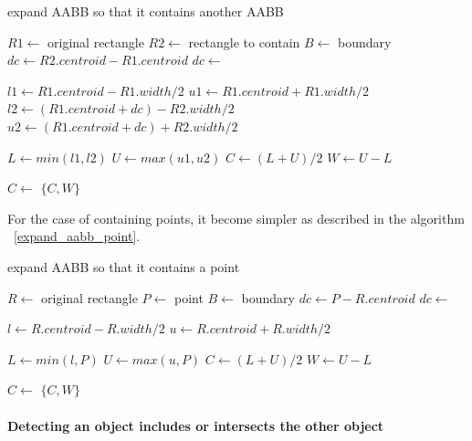 \documentclass[10pt,letterpaper,twocolumn]{article}
\begin{document}
\begin{algorithm}
    \caption{expand AABB so that it contains another AABB}
    \label{expand_aabb_aabb}
    \begin{algorithmic}
        \State $R1 \gets$ original rectangle
        \State $R2 \gets$ rectangle to contain
        \State $B  \gets$ boundary
            \State $dc \gets R2.centroid - R1.centroid$
            \State $dc \gets$ 

            \State $l1 \gets R1.centroid - R1.width / 2$
            \State $u1 \gets R1.centroid + R1.width / 2$
            \State $l2 \gets (R1.centroid + dc) - R2.width / 2$
            \State $u2 \gets (R1.centroid + dc) + R2.width / 2$

            \State $L \gets min(l1, l2)$
            \State $U \gets max(u1, u2)$
            \State $C \gets (L + U) / 2$
            \State $W \gets U - L$

            \State $C \gets$ 
            \State \Return $\{C, W\}$
        \EndFunction
     \end{algorithmic}
\end{algorithm}

For the case of containing points, it become simpler as described in the
algorithm ~\ref{expand_aabb_point}.

\begin{algorithm}
    \caption{expand AABB so that it contains a point}
    \label{expand_aabb_point}
    \begin{algorithmic}
        \State $R \gets$ original rectangle
        \State $P \gets$ point
        \State $B \gets$ boundary
            \State $dc \gets P - R.centroid$
            \State $dc \gets$ 

            \State $l \gets R.centroid - R.width / 2$
            \State $u \gets R.centroid + R.width / 2$

            \State $L \gets min(l, P)$
            \State $U \gets max(u, P)$
            \State $C \gets (L + U) / 2$
            \State $W \gets U - L$

            \State $C \gets$ 
            \State \Return $\{C, W\}$
        \EndFunction
     \end{algorithmic}
\end{algorithm}

\paragraph{Detecting an object includes or intersects the other object}
\end{document}
